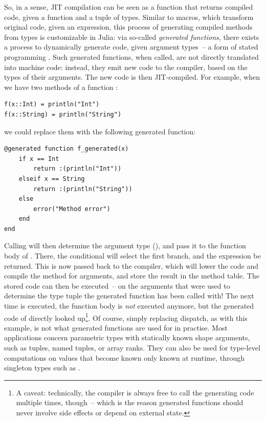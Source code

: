 So, in a sense, JIT compilation can be seen as a function that returns compiled code, given a
function and a tuple of types.  Similar to macros, which transform original code, given an
expression, this process of generating compiled methods from types is customizable in Julia: via
so-called \emph{generated functions}, there exists a process to dynamically generate code, given
argument types~-- a form of stated programming
\parencite{rompf2010lightweight,bolewski2015staged}. Such generated functions, when called, are not
directly translated into machine code: instead, they emit new code to the compiler, based on the
types of their arguments.  The new code is then JIT-compiled.  For example, when we have two methods
of a function :
\begin{lstlisting}
f(x::Int) = println("Int")
f(x::String) = println("String")
\end{lstlisting}
we could replace them with the following generated function:
\begin{lstlisting}
@generated function f_generated(x)
    if x == Int
        return :(println("Int"))
    elseif x == String
        return :(println("String"))
    else
        error("Method error")
    end
end
\end{lstlisting}
Calling  will then determine the argument type (), and
pass it to the function body of .  There, the conditional will select the first
branch, and the expression  be returned.  This is now passed back to the
compiler, which will lower the code and compile the method for  arguments, and store the
result in the method table.  The stored code can then be executed~-- on the arguments that were used
to determine the type tuple the generated function has been called with!  The next time
 is executed, the function body is \emph{not} executed anymore, but the generated
code of  directly looked up\footnote{A caveat: technically, the compiler is
  always free to call the generating code multiple times, though~-- which is the reason generated
  functions should never involve side effects or depend on external state.}.  Of course, simply
replacing dispatch, as with this example, is not what generated functions are used for in practise.
Most applications concern parametric types with statically known shape arguments, such as tuples,
named tuples, or array ranks.  They can also be used for type-level computations on values that
become known only known at runtime, through singleton types such as .

